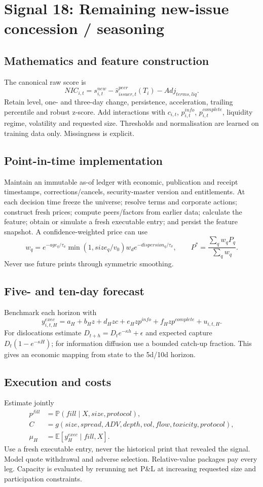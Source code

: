 \documentclass[10pt]{article}
\newcommand{\E}{\mathbb{E}}\newcommand{\Pp}{\mathbb{P}}
\begin{document}
\section{Signal 18: Remaining new-issue concession / seasoning}
\subsection{Mathematics and feature construction}
The canonical raw score is
\begin{equation}NIC_{i,t}=s^{new}_{i,t}-\widehat s^{peer}_{issuer,t}(T_i)-Adj_{terms,liq}.\end{equation}
Retain level, one- and three-day change, persistence, acceleration, trailing percentile and robust z-score. Add interactions with $c_{i,t}$, $p^{info}_{i,t}$, $p^{complete}_{i,t}$, liquidity regime, volatility and requested size. Thresholds and normalisation are learned on training data only. Missingness is explicit.

\subsection{Point-in-time implementation}
Maintain an immutable as-of ledger with economic, publication and receipt timestamps, corrections/cancels, security-master version and entitlements. At each decision time freeze the universe; resolve terms and corporate actions; construct fresh prices; compute peers/factors from earlier data; calculate the feature; obtain or simulate a fresh executable entry; and persist the feature snapshot. A confidence-weighted price can use
\[w_q=e^{-age_q/\tau_a}\min(1,size_q/v_0)w_d e^{-dispersion_q/\tau_\sigma},\qquad P^*=\frac{\sum_qw_qP_q}{\sum_qw_q}.\]
Never use future prints through symmetric smoothing.

\subsection{Five- and ten-day forecast}
Benchmark each horizon with
\[y^{exec}_{i,t,H}=a_H+b_Hz+d_Hzc+e_Hzp^{info}+f_Hzp^{complete}+u_{i,t,H}.\]
For dislocations estimate $D_{t+h}=D_te^{-\kappa h}+\epsilon$ and expected capture $D_t(1-e^{-\kappa H})$; for information diffusion use a bounded catch-up fraction. This gives an economic mapping from state to the 5d/10d horizon.

\subsection{Execution and costs}
Estimate jointly
\begin{align}
p^{fill}&=\Pp(fill\mid X,size,protocol),\\
C&=g(size,spread,ADV,depth,vol,flow,toxicity,protocol),\\
\mu_H&=\E[y^{exec}_H\mid fill,X].
\end{align}
Use a fresh executable entry, never the historical print that revealed the signal. Model quote withdrawal and adverse selection. Relative-value packages pay every leg. Capacity is evaluated by rerunning net P\&L at increasing requested size and participation constraints.
\end{document}

